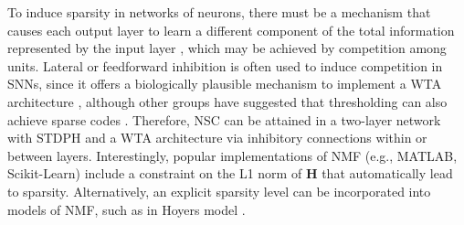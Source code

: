 
To induce sparsity in networks of neurons, there must be a mechanism that causes each output layer to learn a different component of the total information represented by the input layer \citep{Foldiak1990}, which may be achieved by competition among units. Lateral or feedforward inhibition is often used to induce competition in SNNs, since it offers a biologically plausible mechanism to implement a \ac{WTA} architecture \citep{Coultrip1992}, although other groups have suggested that thresholding can also achieve sparse codes \citep{Rozell2008}. Therefore, \ac{NSC} can be attained in a two-layer network with \ac{STDPH} and a \ac{WTA} architecture via inhibitory connections within or between layers. Interestingly, popular implementations of \ac{NMF} (e.g., MATLAB, Scikit-Learn) include a constraint on the L1 norm of \textbf{H} that automatically lead to sparsity. Alternatively, an explicit sparsity level can be incorporated into models of \ac{NMF}, such as in Hoyer\textsc{}s model \citep{Hoyer2004}.


